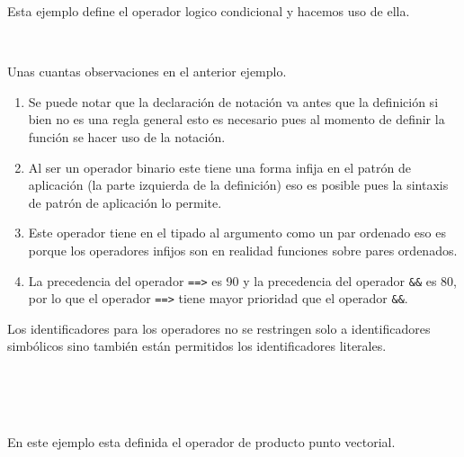       Esta ejemplo define el operador logico condicional y hacemos uso de ella.
      
      \begin{fxcode}
         \\
      \end{fxcode}
      
      Unas cuantas observaciones en el anterior ejemplo.
      
      \begin{enumerate}
         \item Se puede notar que la declaración de notación va antes que la definición si bien no es una regla general esto es necesario pues al momento de definir la función se hacer uso de la notación.
         \item Al ser un operador binario este tiene una forma infija en el patrón de aplicación (la parte izquierda de la definición) eso es posible pues la sintaxis de patrón de aplicación lo permite.
         \item Este operador tiene en el tipado al argumento como un par ordenado eso es porque los operadores infijos son en realidad funciones sobre pares ordenados.
         \item La precedencia del operador \texttt{==>} es 90 y la precedencia del operador \texttt{\&\&} es 80, por lo que el operador \texttt{==>} tiene mayor prioridad que el operador \texttt{\&\&}.
      \end{enumerate}
      
      Los identificadores para los operadores no se restringen solo a identificadores simbólicos sino también están permitidos los identificadores literales.
      
      \begin{fxcode}
         \\
         \\
         \\
      \end{fxcode}
      
      En este ejemplo esta definida el operador de producto punto vectorial.
      
      \begin{fxcode}
         \\
      \end{fxcode}
      
